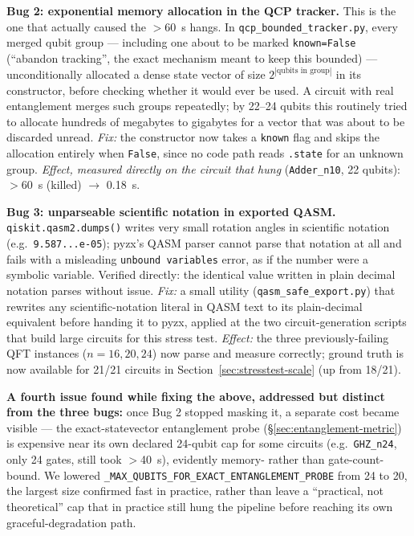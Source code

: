 \documentclass[9pt,twocolumn]{extarticle}
\begin{document}
\textbf{Bug 2: exponential memory allocation in the QCP tracker.} This is
the one that actually caused the $>$60~s hangs. In
\texttt{qcp\_bounded\_tracker.py}, every merged qubit group --- including
one about to be marked \texttt{known=False} (``abandon tracking'', the
exact mechanism meant to keep this bounded) --- unconditionally allocated
a dense state vector of size $2^{|\text{qubits in group}|}$ in its
constructor, before checking whether it would ever be used. A circuit with
real entanglement merges such groups repeatedly; by 22--24 qubits this
routinely tried to allocate hundreds of megabytes to gigabytes for a
vector that was about to be discarded unread. \emph{Fix:} the constructor
now takes a \texttt{known} flag and skips the allocation entirely when
\texttt{False}, since no code path reads \texttt{.state} for an unknown
group. \emph{Effect, measured directly on the circuit that hung}
(\texttt{Adder\_n10}, 22 qubits): $>$60~s (killed) $\to$ 0.18~s.

\textbf{Bug 3: unparseable scientific notation in exported QASM.}
\texttt{qiskit.qasm2.dumps()} writes very small rotation angles in
scientific notation (e.g.\ \texttt{9.587...e-05}); pyzx's QASM parser
cannot parse that notation at all and fails with a misleading
\texttt{unbound variables} error, as if the number were a symbolic
variable. Verified directly: the identical value written in plain decimal
notation parses without issue. \emph{Fix:} a small utility
(\texttt{qasm\_safe\_export.py}) that rewrites any scientific-notation
literal in QASM text to its plain-decimal equivalent before handing it to
pyzx, applied at the two circuit-generation scripts that build large
circuits for this stress test. \emph{Effect:} the three previously-failing
QFT instances ($n{=}16,20,24$) now parse and measure correctly; ground
truth is now available for 21/21 circuits in
Section~\ref{sec:stresstest-scale} (up from 18/21).

\textbf{A fourth issue found while fixing the above, addressed but
distinct from the three bugs:} once Bug 2 stopped masking it, a separate
cost became visible --- the exact-statevector entanglement probe
(\S\ref{sec:entanglement-metric}) is expensive near its own declared
24-qubit cap for some circuits (e.g.\ \texttt{GHZ\_n24}, only 24 gates,
still took $>$40~s), evidently memory- rather than gate-count-bound. We
lowered \texttt{\_MAX\_QUBITS\_FOR\_EXACT\_ENTANGLEMENT\_PROBE} from 24 to
20, the largest size confirmed fast in practice, rather than leave a
``practical, not theoretical'' cap that in practice still hung the
pipeline before reaching its own graceful-degradation path.
\end{document}
